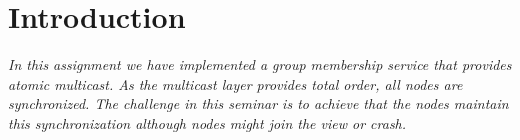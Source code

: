 \section{Introduction}

\textit{In this assignment we have implemented a group membership service that provides atomic multicast.
\newline As the multicast layer provides total order, all nodes are synchronized.
\newline The challenge in this seminar is to achieve that the nodes maintain this synchronization although nodes might join the view or crash. }